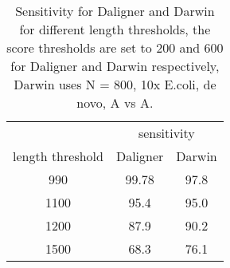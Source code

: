 \documentclass[../thesis.tex]{subfiles}
\begin{document}
\begin{table}
\centering
\caption{Sensitivity for Daligner and Darwin for different length thresholds, the score thresholds are set to 200 and 600 for Daligner and Darwin respectively, Darwin uses N = 800, 10x E.coli, de novo, A vs A.}
\label{tbl:length_thresholds}
\begin{tabular}{c|c c}
 & \multicolumn{2}{c}{sensitivity} \\
length threshold & Daligner & Darwin \\ \hline
 990 & 99.78 & 97.8 \\
1100 &  95.4 & 95.0 \\
1200 &  87.9 & 90.2 \\
1500 &  68.3 & 76.1 \\
\end{tabular}
\end{table}
\end{document}
